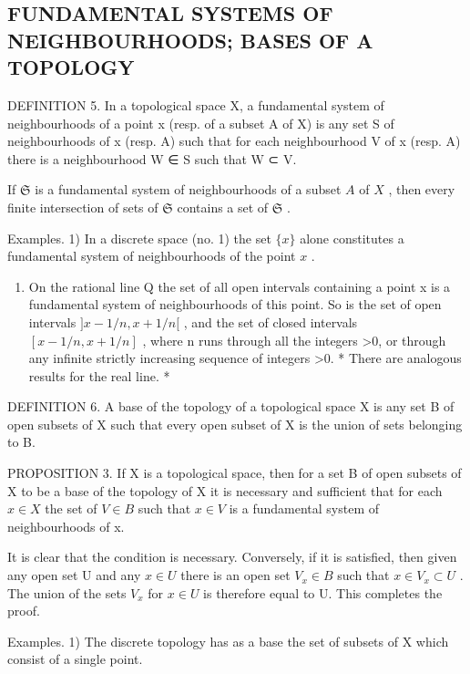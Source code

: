 \subsection{FUNDAMENTAL SYSTEMS OF NEIGHBOURHOODS; BASES OF A TOPOLOGY}

DEFINITION 5. In a topological space X, a fundamental system of neighbourhoods of a point x (resp. of a subset A of X) is any set S of neighbourhoods of x (resp. A) such that for each neighbourhood V of x (resp. A) there is a neighbourhood W ∈ S such that W ⊂ V.

If \(\mathfrak{S}\) is a fundamental system of neighbourhoods of a subset \(A\) of \(X\) , then every finite intersection of sets of \(\mathfrak{S}\) contains a set of \(\mathfrak{S}\) .

Examples. 1) In a discrete space (no. 1) the set \(\{x\}\) alone constitutes a fundamental system of neighbourhoods of the point \(x\) .

\begin{enumerate}
\def\labelenumi{\arabic{enumi})}
\setcounter{enumi}{1}
\tightlist
\item
  On the rational line Q the set of all open intervals containing a point x is a fundamental system of neighbourhoods of this point. So is the set of open intervals \(]x - 1/n, x + 1/n[\) , and the set of closed intervals \([x - 1/n, x + 1/n]\) , where n runs through all the integers \textgreater0, or through any infinite strictly increasing sequence of integers \textgreater0. * There are analogous results for the real line. *
\end{enumerate}

DEFINITION 6. A base of the topology of a topological space X is any set B of open subsets of X such that every open subset of X is the union of sets belonging to B.

PROPOSITION 3. If X is a topological space, then for a set B of open subsets of X to be a base of the topology of X it is necessary and sufficient that for each \(x \in X\) the set of \(V \in B\) such that \(x \in V\) is a fundamental system of neighbourhoods of x.

It is clear that the condition is necessary. Conversely, if it is satisfied, then given any open set U and any \(x \in U\) there is an open set \(V_{x} \in B\) such that \(x \in V_{x} \subset U\) . The union of the sets \(V_{x}\) for \(x \in U\) is therefore equal to U. This completes the proof.

Examples. 1) The discrete topology has as a base the set of subsets of X which consist of a single point.

